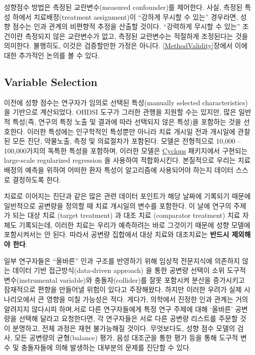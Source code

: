 \documentclass[11pt]{book}
\theoremstyle{definition}
\theoremstyle{definition}
\theoremstyle{definition}
\theoremstyle{remark}
\let\BeginKnitrBlock\begin \let\EndKnitrBlock\end
\begin{document}
성향점수 방법은 측정된 교란변수(measured confounder)를 제어한다. 사실,
측정된 특성 하에서 치료배정(treatment assignment)이 ``강하게 무시할 수
있는'' 경우라면, 성향 점수는 인과 관계의 비편향적 추정을 산출할 것이다.
``강력하게 무시할 수 있는'' 조건이란 측정되지 않은 교란변수가 없고,
측정된 교란변수는 적절하게 조정된다는 것을 의미한다. 불행히도, 이것은
검증할만한 가정은 아니다. \ref{MethodValidity}장에서 이에 대한 추가적인
논의를 볼 수 있다. 

\subsection{Variable Selection}\label{VariableSelection}

이전에 성향 점수는 연구자가 임의로 선택된 특성(manually selected
characteristics) 을 기반으로 계산되었다. OHDSI 도구가 그러한 관행을
지원할 수는 있지만, 많은 일반적 특성(즉, 연구의 특정 노출 및 결과에 따라
선택되지 않은 특성)을 포함하는 것을 선호한다. \citep{tian_2018} 이러한
특성에는 인구학적인 특성뿐만 아니라 치료 개시일 전과 개시일에 관찰된
모든 진단, 약물노출, 측정 및 의료절차가 포함된다. 모델은 전형적으로
10,000 -- 100,000가지의 독특한 특성을 포함하며, 이러한 모델은
\href{https://ohdsi.github.io/Cyclops/}{Cyclops} 패키지에서 구현되는
large-scale regularized regression \citep{suchard_2013}을 사용하여
적합화시킨다. 본질적으로 우리는 치료 배정의 예측을 위하여 어떠한 환자
특성이 알고리즘에 사용되어야 하는지 데이터 스스로 결정하도록 한다.

\BeginKnitrBlock{rmdimportant}
치료로 이어지는 진단과 같은 많은 관련 데이터 포인트가 해당 날짜에
기록되기 때문에 일반적으로 공변량을 정의할 때 치료 개시일의 변수를
포함한다. 이 날에 연구의 주제가 되는 대상 치료 (target treatment) 과
대조 치료 (comparator treatment) 치료 자체도 기록되는데, 이러한 치료는
우리가 예측하려는 바로 그것이기 때문에 성향 모델에 포함시켜서는 안 된다.
따라서 공변량 집합에서 대상 치료와 대조치료는 \textbf{반드시 제외해야
한다}.
\EndKnitrBlock{rmdimportant}

일부 연구자들은 ``올바른'' 인과 구조를 반영하기 위해 임상적 전문지식에
의존하지 않는 데이터 기반 접근방식(data-driven approach) 을 통한 공변량
선택이 소위 도구적 변수(instrumental variable)와 충돌자(collider)를 잘못
포함시켜 분산을 증가시키고 잠재적으로 편향을 만들어낼 위험이 있다고
주장해왔다. \citep{hernan_2002} 하지만 이러한 우려가 실제 시나리오에서
큰 영향을 미칠 가능성은 적다. \citep{schneeweiss_2018} 게다가, 의학에서
진정한 인과 관계는 거의 알려지지 않다시피 하며,서로 다른 연구자들에게
특정 연구 주제에 대해 `올바른' 공변량을 선택해 달라고 요청한다면, 각
연구자들은 서로 다른 공변량 리스트를 주문할 것이 분명하고, 전체 과정은
재현 불가능해질 것이다. 무엇보다도, 성향 점수 모델의 검사, 모든 공변량의
균형(balance) 평가, 음성 대조군을 통한 평가 등을 통해 도구적 변수 및
충돌자들에 의해 발생하는 대부분의 문제를 진단할 수 있다.
 
\end{document}

